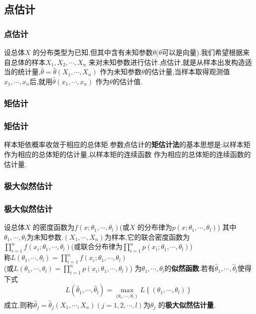 \documentclass[aspectratio=169]{beamer}
\begin{document}
\subsection*{点估计}

\begin{frame}
\frametitle{点估计}
{设总体$X$ 的分布类型为已知,但其中含有未知参数$\theta $($\theta $可以是向量).我们希望根据来自总体的样本$X_{1}, X_{2}, \cdots, X_{n}$
来对未知参数进行估计.点估计,就是从样本出发构造适当的统计量,$\hat{\theta}=\hat{\theta}\left(X_{1}, \cdots, X_{n}\right)$
作为未知参数$\theta $的估计量,当样本取得观测值$x_{1}, \cdots, x_{n}$后,就用$\hat{\theta}\left(x_{1}, \cdots, x_{n}\right)$
作为$\theta $的估计值.}
\end{frame}

\subsubsection*{矩估计}

\begin{frame}
\frametitle{矩估计}
{样本矩依概率收敛于相应的总体矩.参数点估计的\textbf{矩估计法}的基本思想是:以样本矩作为相应的总体矩的估计量,以样本矩的连续函数
作为相应的总体矩的连续函数的估计量.}
\end{frame}

\subsubsection*{极大似然估计}

\begin{frame}
\frametitle{极大似然估计}
\vspace{0.25cm}
{
  \begin{definition}
    设总体$X$ 的密度函数为$f\left(x ; \theta_{1}, \cdots, \theta_{l}\right)$(或$X$ 的分布律为$p\left(x ; \theta_{1}, \cdots, \theta_{l}\right)$)
    其中$\theta_{1}, \cdots, \theta_{l}$为未知参数.$\left(X_{1}, \cdots, X_{n}\right)$为样本,它的联合密度函数为
    $\prod_{i=1}^{n} f\left(x_{i} ; \theta_{1}, \cdots, \theta_{l}\right)$(或联合分布律为$\prod_{i=1}^{n} p\left(x_{i} ; \theta_{1}, \cdots, \theta_{l}\right)$)
    \\称$L\left(\theta_{1}, \cdots, \theta_{l}\right)=\prod_{i=1}^{n} f\left(x_{i} ; \theta_{1}, \cdots, \theta_{l}\right)$
    \\(或$L\left(\theta_{1}, \cdots, \theta_{l}\right)=\prod_{i=1}^{n} p\left(x_{i} ; \theta_{1}, \cdots, \theta_{l}\right)$)
    为$\theta_{1}, \cdots, \theta_{l}$的\textbf{似然函数}.若有$\hat{\theta}_{1}, \cdots, \hat{\theta}_{l}$使得下式
    \begin{equation}
      L\left ( \hat\theta _{1}  ,\cdots ,\hat \theta_{l}\right ) =\max _{\left.(\theta _{1}, \cdots, \theta_{l}\right)}L\left\{ \left(\theta_{1}, \cdots, \theta_{l}\right)\right \} 
    \end{equation}
    成立,则称$\hat{\theta}_{j}=\hat{\theta}_{j}\left(X_{1}, \cdots, X_{n}\right) (j=1,2,\cdots ,l)$为$\theta_{j}$
    的\textbf{极大似然估计量}.
  \end{definition}
}
\end{frame}
\end{document}
